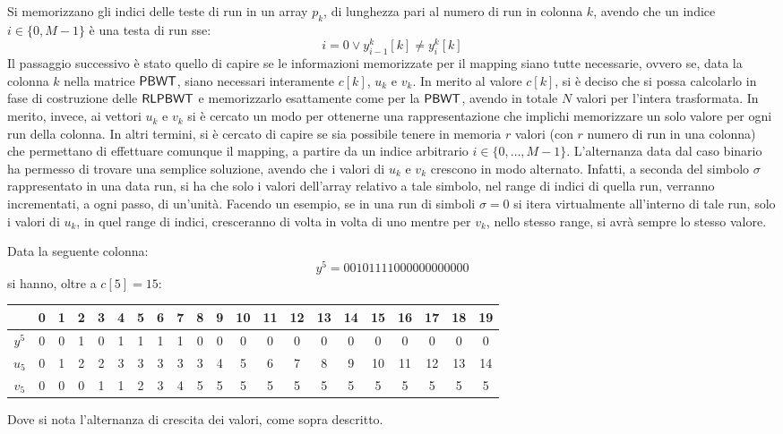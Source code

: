 Si memorizzano gli indici delle teste di run in un array $p_k$, di lunghezza
pari al numero di run in colonna $k$, avendo che un indice $i\in\{0,M-1\}$ è
una testa di run sse: 
\begin{equation}
  \label{eq:naive1}
  i=0\lor y_{i-1}^k[k]\neq y_i^k[k]
\end{equation}
Il passaggio successivo è stato quello di capire se le informazioni memorizzate
per il mapping siano tutte necessarie, ovvero se, data la colonna $k$
nella matrice $\mbox{\rm {\sf PBWT}}$, siano necessari interamente $c[k]$, $u_k$ e $v_k$. In
merito al valore $c[k]$, si è deciso che si possa calcolarlo 
in fase di costruzione delle $\mbox{\rm {\sf RLPBWT}}$ e memorizzarlo esattamente come per
la $\mbox{\rm {\sf PBWT}}$, avendo in totale $N$ valori per l'intera trasformata. In merito,
invece, ai vettori $u_k$ e $v_k$ si è cercato un modo 
per ottenerne una rappresentazione che implichi memorizzare un solo valore per
ogni 
run della colonna. In altri termini, si è cercato di capire se sia possibile
tenere in memoria $r$ valori (con $r$ numero di run in una colonna) che
permettano di effettuare comunque il 
mapping, a partire da un indice arbitrario $i\in\{0,\ldots,M-1\}$. L'alternanza
data dal caso binario ha permesso di trovare una 
semplice soluzione, avendo che i valori di $u_k$ e $v_k$ crescono in
modo 
alternato. Infatti, a seconda del simbolo $\sigma$ rappresentato in una data
run, si ha che solo i valori dell'array relativo a tale simbolo, nel range di
indici di quella run, verranno incrementati, a ogni passo, di un'unità. Facendo
un esempio, se in una run di simboli $\sigma=0$ si itera
virtualmente all'interno di tale run, solo i valori di $u_k$, in quel
range di indici, cresceranno di volta in volta di uno mentre per $v_k$, nello
stesso range, si avrà sempre lo stesso valore.
\begin{esempio}
  Data la seguente colonna:
  \[y^5=00101111000000000000\]
  si hanno, oltre a $c[5]=15$:
  \begin{table}[H]
    \footnotesize
    \centering
    \begin{tabular}{c||cc|c|c|cccc|cccccccccccc}
      & 0 & 1 & 2 & 3 & 4 & 5 & 6 & 7 & 8 & 9 & 10 & 11 & 12 & 13 & 14 & 15 & 16
      & 17 & 18 & 19\\
      \hline
      \hline
      $y^5$ & 0 & 0 & 1 & 0 & 1 & 1 & 1 & 1 & 0 & 0 & 0 & 0 & 0 & 0 & 0 & 0 & 0
      & 0 & 0 & 0\\
      \hline
      \hline
      $u_5$ & 0 & 1 & 2 & 2 & 3 & 3 & 3 & 3 & 3 & 4 & 5 & 6 & 7 & 8 & 9 & 10
      & 11 & 12 & 13 & 14\\
      \hline
      $v_5$ & 0 & 0 & 0 & 1 & 1 & 2 & 3 & 4 & 5 & 5 & 5 & 5 & 5 & 5 & 5 & 5 & 5
      & 5 & 5 & 5
    \end{tabular}
  \end{table}
  \noindent
  Dove si nota l'alternanza di crescita dei valori, come sopra descritto.
\end{esempio}
